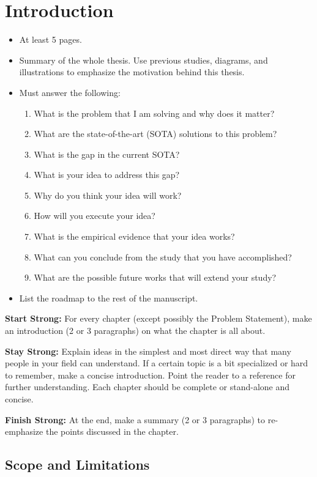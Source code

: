 \chapter{Introduction}

\begin{itemize}
    \item At least 5 pages.
    \item Summary of the whole thesis. Use previous studies, diagrams, and illustrations to emphasize the motivation behind this thesis.
    \item Must answer the following:
    \begin{enumerate}
        \item What is the problem that I am solving and why does it matter?
        \item What are the state-of-the-art (SOTA) solutions to this problem?
        \item What is the gap in the current SOTA?
        \item What is your idea to address this gap?
        \item Why do you think your idea will work?
        \item How will you execute your idea?
        \item What is the empirical evidence that your idea works?
        \item What can you conclude from the study that you have accomplished?
        \item What are the possible future works that will extend your study?
    \end{enumerate}
    \item List the roadmap to the rest of the manuscript.
\end{itemize}

\textbf{Start Strong:} For every chapter (except possibly the Problem Statement), make an introduction (2 or 3 paragraphs) on what the chapter is all about.

\textbf{Stay Strong:} Explain ideas in the simplest and most direct way that many people in your field can understand. If a certain topic is a bit specialized or hard to remember, make a concise introduction. Point the reader to a reference for further understanding. Each chapter should be complete or stand-alone and concise.

\textbf{Finish Strong:} At the end, make a summary (2 or 3 paragraphs) to re-emphasize the points discussed in the chapter.

\section{Scope and Limitations}

